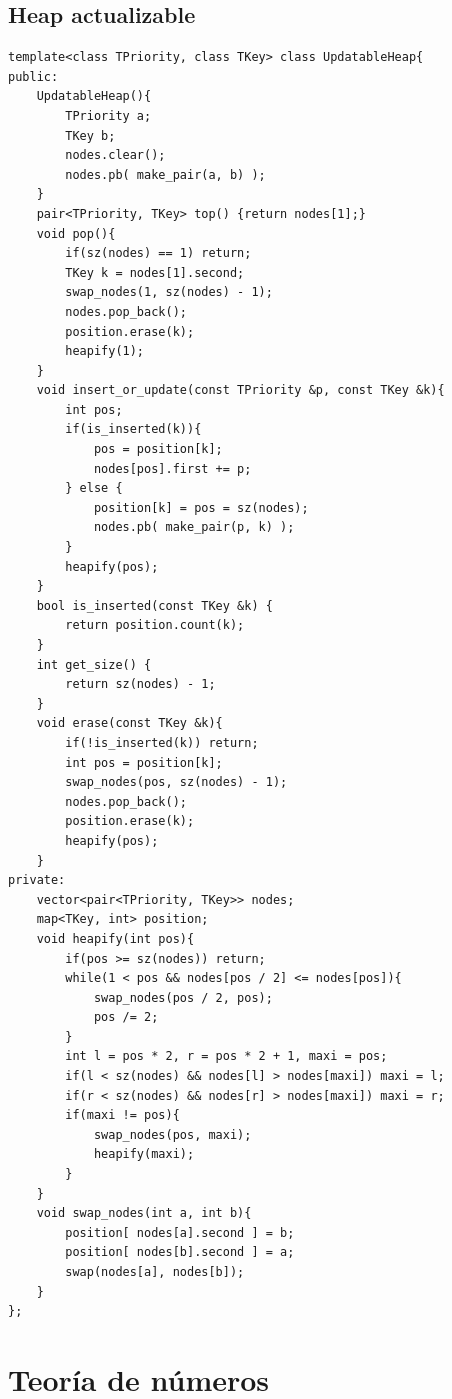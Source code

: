 \documentclass[10pt,spanish,mexico]{article}
\numberwithin{equation}{section}
\begin{document}
\begin{multicols}{2}
\vspace{-1.2\baselineskip}
\hrulefill
\subsection{Heap actualizable}
\begin{verbatim}
template<class TPriority, class TKey> class UpdatableHeap{
public:
	UpdatableHeap(){
        TPriority a;
        TKey b;
        nodes.clear();
        nodes.pb( make_pair(a, b) );
    }
    pair<TPriority, TKey> top() {return nodes[1];}
    void pop(){
        if(sz(nodes) == 1) return;
        TKey k = nodes[1].second;
        swap_nodes(1, sz(nodes) - 1);
        nodes.pop_back();
        position.erase(k);
        heapify(1);
    }
    void insert_or_update(const TPriority &p, const TKey &k){
        int pos;
        if(is_inserted(k)){
            pos = position[k];
            nodes[pos].first += p;
        } else {
            position[k] = pos = sz(nodes);
            nodes.pb( make_pair(p, k) );
        }
        heapify(pos);
    }
    bool is_inserted(const TKey &k) {
        return position.count(k);
    }
    int get_size() {
        return sz(nodes) - 1;
    }
    void erase(const TKey &k){
        if(!is_inserted(k)) return;
        int pos = position[k];
        swap_nodes(pos, sz(nodes) - 1);
        nodes.pop_back();
        position.erase(k);
        heapify(pos);
    }
private:
    vector<pair<TPriority, TKey>> nodes;
    map<TKey, int> position;
    void heapify(int pos){
        if(pos >= sz(nodes)) return;
        while(1 < pos && nodes[pos / 2] <= nodes[pos]){
            swap_nodes(pos / 2, pos);
            pos /= 2;
        }
        int l = pos * 2, r = pos * 2 + 1, maxi = pos;
        if(l < sz(nodes) && nodes[l] > nodes[maxi]) maxi = l;
        if(r < sz(nodes) && nodes[r] > nodes[maxi]) maxi = r;
        if(maxi != pos){
            swap_nodes(pos, maxi);
            heapify(maxi);
        }
    }
    void swap_nodes(int a, int b){
        position[ nodes[a].second ] = b;
        position[ nodes[b].second ] = a;
        swap(nodes[a], nodes[b]);
    }
};
\end{verbatim}

\vspace{-1.2\baselineskip}
\hrulefill
\section{Teoría de números}

\end{multicols}
\end{document}
